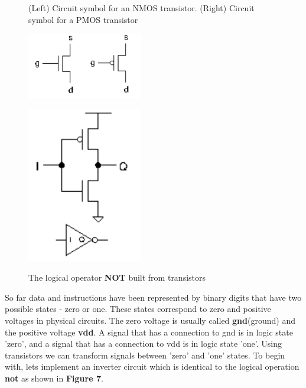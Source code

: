 \documentclass{article}
\begin{document}
	\begin{figure}[h]
	\begin{minipage}[t]{.45\textwidth}
		\caption{(Left) Circuit symbol for an NMOS transistor.  (Right) Circuit symbol for a PMOS transistor}
		\vspace{15pt}
		\centering
		\includegraphics[width=0.45\textwidth]{transistors}
		\label{fig:transistors}
	\end{minipage}
	\hfill
	\begin{minipage}[t]{.45\textwidth}
		\caption{The logical operator \textbf{NOT} built from transistors}
		\vspace{15pt}
		\centering
		\includegraphics[width=0.45\textwidth]{not_gate_transistors}
		\label{fig:not_transistors}
	\end{minipage}
	\end{figure}
	
	So far data and instructions have been represented by binary digits that have two possible states - zero or one. These states correspond to zero and positive voltages in physical circuits. The zero voltage is usually called \textbf{gnd}(ground) and the positive voltage \textbf{vdd}. A signal that has a connection to gnd is in logic state 'zero', and a signal that has a connection to vdd is in logic state 'one'. Using transistors we can transform signals between 'zero' and 'one' states. To begin with, lets implement an inverter circuit which is identical to the logical operation \textbf{not} as shown in \textbf{Figure 7}.	
	
\end{document}
